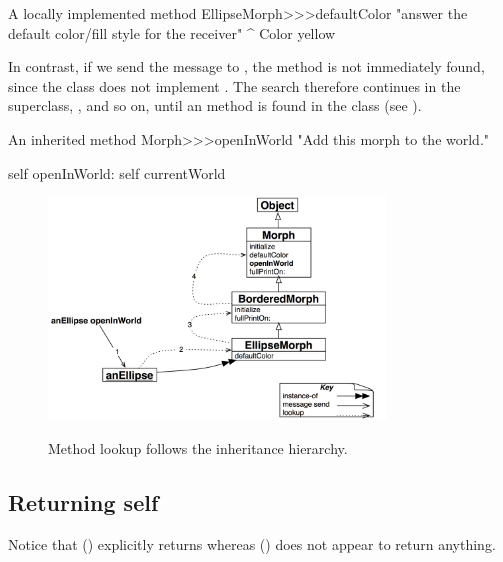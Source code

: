 \documentclass[a4paper,10pt,twoside]{book}
\begin{document}
\begin{method}[defaultColor]{A locally implemented method}
EllipseMorph>>>defaultColor
	"answer the default color/fill style for the receiver"
	^ Color yellow
\end{method}

In contrast, if we send the message  to , the method is not immediately found, since the class  does not implement .
The search therefore continues in the superclass, , and so on, until an  method is found in the class  (see ).

\begin{method}[openInWorld]{An inherited method}
Morph>>>openInWorld
	"Add this morph to the world."

	self openInWorld: self currentWorld
\end{method}

\begin{figure}[htb]
\begin{center}
	{\includegraphics[width=0.8\textwidth]{openInWorldLookup}}
\caption{Method lookup follows the inheritance hierarchy.}
\end{center}
\end{figure}

\subsection{Returning self}

Notice that  () explicitly returns  whereas  () does not appear to return anything.
\end{document}
